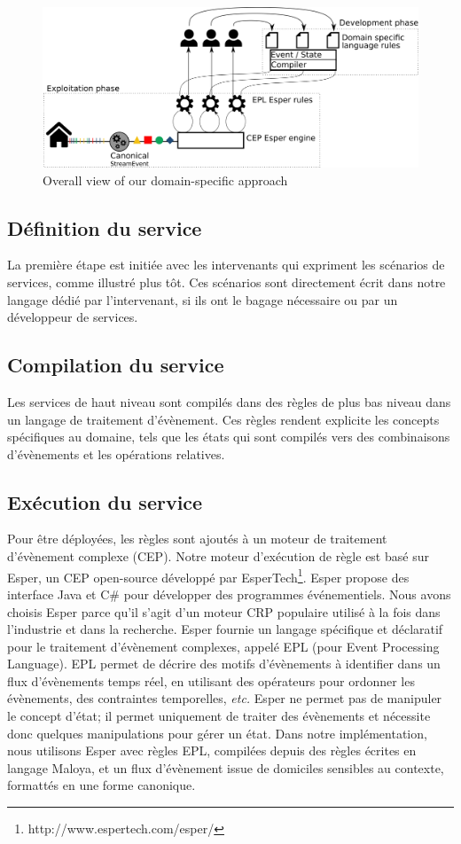 \begin{figure}[h]
\centering
  \includegraphics[scale=0.2]{gfx/approach}
\caption{Overall view of our domain-specific approach}
\label{fig:functionalarchi}
\end{figure}

\subsection{Définition du service}
La première étape est initiée avec les intervenants qui expriment les scénarios de services, comme illustré plus tôt. Ces scénarios sont directement écrit dans notre langage dédié par l'intervenant, si ils ont le bagage nécessaire ou par un développeur de services.

\subsection{Compilation du service}
Les services de haut niveau sont compilés dans des règles de plus bas niveau dans un langage de traitement d'évènement. Ces règles rendent explicite les concepts spécifiques au domaine, tels que les états qui sont compilés vers des combinaisons d'évènements et les opérations relatives.

\subsection{Exécution du service}
Pour être déployées, les règles sont ajoutés à un moteur de traitement d'évènement complexe (CEP). Notre moteur d'exécution de règle est basé sur Esper, un CEP open-source développé par EsperTech\footnote{http://www.espertech.com/esper/}. Esper propose des interface Java et C\# pour développer des programmes événementiels. Nous avons choisis Esper parce qu'il s'agit d'un moteur CRP populaire utilisé à la fois dans l'industrie et dans la recherche. Esper fournie un langage spécifique et déclaratif pour le traitement d'évènement complexes, appelé EPL (pour Event Processing Language). EPL permet de décrire des motifs d'évènements à identifier dans un flux d'évènements temps réel, en utilisant des opérateurs pour ordonner les évènements, des contraintes temporelles, {\em etc.} Esper ne permet pas de manipuler le concept d'état; il permet uniquement de traiter des évènements et nécessite donc quelques manipulations pour gérer un état. Dans notre implémentation, nous utilisons Esper avec règles EPL, compilées depuis des règles écrites en langage Maloya, et un flux d'évènement issue de domiciles sensibles au contexte, formattés en une forme canonique.

